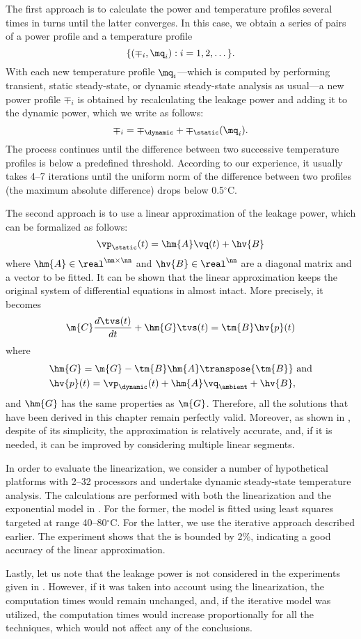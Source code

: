 The first approach is to calculate the power and temperature profiles several
times in turns until the latter converges. In this case, we obtain a series of
pairs of a power profile and a temperature profile
\[
  \{ (\mp_i, \mq_i): i = 1, 2, \dots \}.
\]
With each new temperature profile $\mq_i$---which is computed by performing
transient, static steady-state, or dynamic steady-state analysis as usual---a
new power profile $\mp_i$ is obtained by recalculating the leakage power and
adding it to the dynamic power, which we write as follows:
\[
  \mp_i = \mp_\dynamic + \mp_\static(\mq_i).
\]
The process continues until the difference between two successive temperature
profiles is below a predefined threshold. According to our experience, it
usually takes 4--7 iterations until the uniform norm of the difference between
two profiles (the maximum absolute difference) drops below 0.5${}^\circ$C.

The second approach is to use a linear approximation of the leakage power, which
can be formalized as follows:
\[
  \vp_\static(t) = \hm{A} \vq(t) + \hv{B}
\]
where $\hm{A} \in \real^{\nn \times \nn}$ and $\hv{B} \in \real^\nn$ are a
diagonal matrix and a vector to be fitted. It can be shown that the linear
approximation keeps the original system of differential equations in
 almost intact. More precisely, it
becomes
\[
  \m{C} \frac{d\tvs(t)}{dt} + \hm{G} \tvs(t) = \tm{B} \hv{p}(t)
\]
where
\begin{align*}
  & \hm{G} = \m{G} - \tm{B} \hm{A} \transpose{\tm{B}} \text{ and} \\
  & \hv{p}(t) = \vp_\dynamic(t) + \hm{A} \vq_\ambient + \hv{B},
\end{align*}
and $\hm{G}$ has the same properties as $\m{G}$. Therefore, all the solutions
that have been derived in this chapter remain perfectly valid. Moreover, as
shown in \cite{liu2007}, despite of its simplicity, the approximation is
relatively accurate, and, if it is needed, it can be improved by considering
multiple linear segments.

In order to evaluate the linearization, we consider a number of hypothetical
platforms with 2--32 processors and undertake dynamic steady-state temperature
analysis. The calculations are performed with both the linearization and the
exponential model in . For the former, the model is fitted
using least squares \cite{press2007} targeted at range 40--80${}^\circ$C. For
the latter, we use the iterative approach described earlier. The experiment
shows that the  is bounded by 2\%, indicating a good accuracy of the
linear approximation.

Lastly, let us note that the leakage power is not considered in the experiments
given in . However, if it was taken into
account using the linearization, the computation times would remain unchanged,
and, if the iterative model was utilized, the computation times would increase
proportionally for all the techniques, which would not affect any of the
conclusions.
